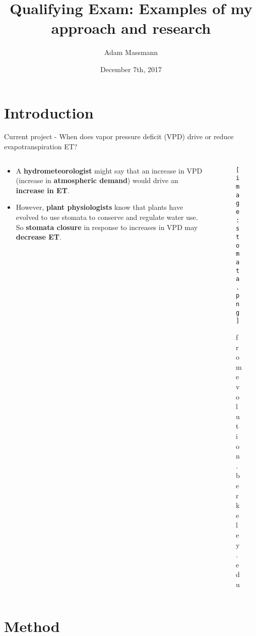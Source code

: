 \documentclass{beamer}
\title[Your Short Title]{Qualifying Exam: Examples of my approach and research}
\author{Adam Massmann}
\date{December 7th, 2017}
\begin{document}
\begin{frame}
  \titlepage
\end{frame}


\section{Introduction}
\begin{frame}{Current project - When does vapor pressure deficit (VPD) drive or reduce evapotranspiration ET?}
  \begin{columns}[T,onlytextwidth]
    \begin{column}{0.5\textwidth}
      \begin{minipage}{\textwidth}
        
        \begin{itemize}
        \item A \textbf{hydrometeorologist} might say that an increase in VPD (increase in \textbf{atmospheric demand}) would drive an \textbf{increase in ET}.
        \item However, \textbf{plant physiologists} know that plants have evolved to use stomata to conserve and regulate water use. So \textbf{stomata closure} in response to increases in VPD may \textbf{decrease ET}.
        \end{itemize}
      \end{minipage}
    \end{column}
    \begin{column}{0.5\textwidth}
      \begin{minipage}{\textwidth}
        \begin{figure}
          \texttt{[image: stomata.png]}%
          \caption{from evolution.berkeley.edu}
        \end{figure}
      \end{minipage}
    \end{column}
  \end{columns}
\end{frame}

\section{Method}
\end{document}
